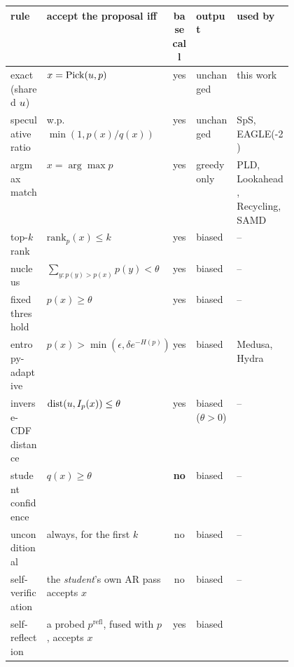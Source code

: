 {\setlength{\tabcolsep}{3pt}\footnotesize
\begin{tabular}{@{}l p{0.27\linewidth} c l p{0.20\linewidth}@{}}
\toprule
rule & accept the proposal iff & base call & output & used by \\
\midrule
exact (shared $u$) & $x = \operatorname{Pick}(u, p)$ & yes & unchanged & this work \\
speculative ratio & w.p.\ $\min(1, p(x)/q(x))$ & yes & unchanged & SpS, EAGLE(-2) \\
argmax match & $x = \arg\max p$ & yes & greedy only & PLD, Lookahead, Recycling, SAMD \\
top-$k$ rank & $\mathrm{rank}_p(x) \leq k$ & yes & biased & -- \\
nucleus & $\sum_{y: p(y) > p(x)} p(y) < \theta$ & yes & biased & -- \\
fixed threshold & $p(x) \geq \theta$ & yes & biased & -- \\
entropy-adaptive & $p(x) > \min(\epsilon, \delta e^{-H(p)})$ & yes & biased & Medusa, Hydra \\
inverse-CDF distance & $\mathrm{dist}(u, I_p(x)) \leq \theta$ & yes & biased ($\theta > 0$) & -- \\
student confidence & $q(x) \geq \theta$ & \textbf{no} & biased & -- \\
unconditional & always, for the first $k$ & no & biased & -- \\
self-verification & the \emph{student}'s own AR pass accepts $x$ & no & biased & -- \\
self-reflection & a probed $p^{\mathrm{refl}}$, fused with $p$, accepts $x$ & yes & biased & \citet{wang2025reflective} \\
\bottomrule
\end{tabular}}

